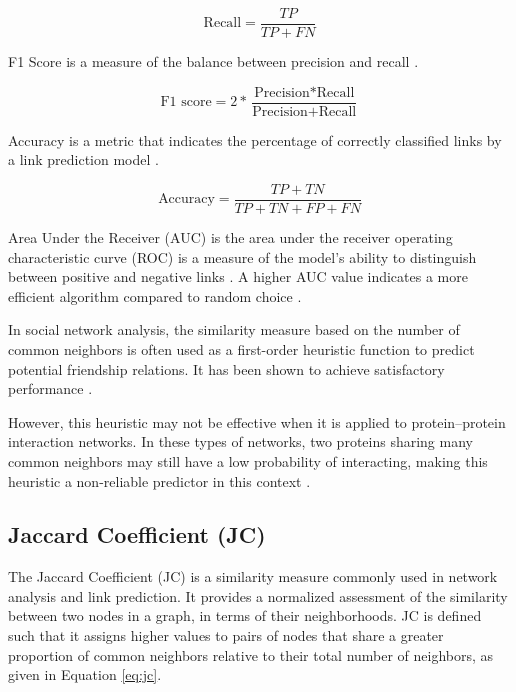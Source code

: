 \begin{equation}
\label{eq:recall}
  \text{Recall} = \frac{TP}{TP + FN}
\end{equation}

F1 Score is a measure of the balance between precision and recall \cite{arrar2023comprehensive}.

\begin{equation}
\label{eq:f1score}
  \text{F1 score} = 2 * \frac{\text{Precision} * \text{Recall}}{\text{Precision} + \text{Recall}}
\end{equation}

Accuracy is a metric that indicates the percentage of correctly classified links by a link prediction model \cite{arrar2023comprehensive}.

\begin{equation}
\label{eq:accuracy}
  \text{Accuracy} = \frac{TP + TN}{TP + TN + FP + FN}
\end{equation}

Area Under the Receiver (AUC) \cite{hanley1982meaning} is the area under the receiver operating characteristic curve (ROC) is a measure of the model’s ability to distinguish between positive and negative links \cite{arrar2023comprehensive}. A higher AUC value indicates a more efficient algorithm compared to random choice \cite{mumin2022efficient}. 


In social network analysis, the similarity measure based on the number of common neighbors is often used as a first-order heuristic function to predict potential friendship relations. It has been shown to achieve satisfactory performance \cite{arrar2023comprehensive}.

However, this heuristic may not be effective when it is applied to protein–protein interaction networks. In these types of networks, two proteins sharing many common neighbors may still have a low probability of interacting, making this heuristic a non-reliable predictor in this context \cite{arrar2023comprehensive}.



\subsection{Jaccard Coefficient (JC)}

The Jaccard Coefficient (JC) \cite{jaccard1901etude} is a similarity measure commonly used in network analysis and link prediction. It provides a normalized assessment of the similarity between two nodes in a graph, in terms of their neighborhoods. JC is defined such that it assigns higher values to pairs of nodes that share a greater proportion of common neighbors relative to their total number of neighbors, as given in Equation \ref{eq:jc}.

